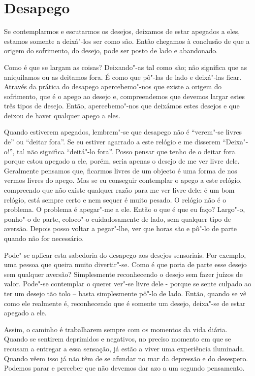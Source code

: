\section{Desapego}

Se contemplarmos e escutarmos os desejos, deixamos de estar apegados a eles,
estamos somente a deixá"-los ser como são. Então chegamos à conclusão de que a
origem do sofrimento, do desejo, pode ser posto de lado e abandonado.

Como é que se largam as coisas? Deixando"-as tal como são; não significa que as
aniquilamos ou as deitamos fora. É como que pô"-las de lado e deixá"-las ficar.
Através da prática do desapego apercebemo"-nos que existe a origem do sofrimento,
que é o apego ao desejo e, compreendemos que devemos largar estes três tipos de
desejo. Então, apercebemo"-nos que deixámos estes desejos e que deixou de haver
qualquer apego a eles.

Quando estiverem apegados, lembrem"-se que desapego não é “verem"-se livres de” ou
“deitar fora”. Se eu estiver agarrado a este relógio e me disserem “Deixa"-o!”,
tal não significa “deitá"-lo fora”. Posso pensar que tenho de o deitar fora
porque estou apegado a ele, porém, seria apenas o desejo de me ver livre dele.
Geralmente pensamos que, ficarmos livres de um objecto é uma forma de nos vermos
livres do apego. Mas se eu conseguir contemplar o apego a este relógio,
compreendo que não existe qualquer razão para me ver livre dele: é um bom
relógio, está sempre certo e nem sequer é muito pesado. O relógio não é o
problema. O problema é apegar"-me a ele. Então o que é que eu faço? Largo"-o,
ponho"-o de parte, coloco"-o cuidadosamente de lado, sem qualquer tipo de aversão.
Depois posso voltar a pegar"-lhe, ver que horas são e pô"-lo de parte quando não
for necessário.

Pode"-se aplicar esta sabedoria do desapego aos desejos sensoriais. Por exemplo,
uma pessoa que queira muito divertir"-se. Como é que poria de parte esse desejo
sem qualquer aversão? Simplesmente reconhecendo o desejo sem fazer juízos de
valor. Pode"-se contemplar o querer ver"-se livre dele - porque se sente culpado
ao ter um desejo tão tolo -- basta simplesmente pô"-lo de lado. Então, quando se
vê como ele realmente é, reconhecendo que é somente um desejo, deixa"-se de estar
apegado a ele.

Assim, o caminho é trabalharem sempre com os momentos da vida diária. Quando se
sentirem deprimidos e negativos, no preciso momento em que se recusam a entregar
a essa sensação, já estão a viver uma experiência iluminada. Quando vêem isso já
não têm de se afundar no mar da depressão e do desespero. Podemos parar e
perceber que não devemos dar azo a um segundo pensamento.

